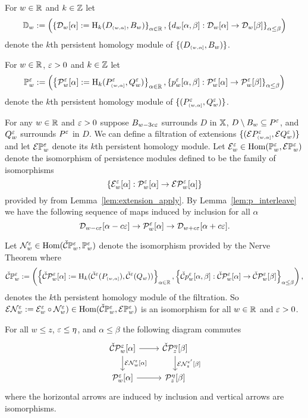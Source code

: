 
For $w\in\mathbb{R}$ and $k\in\mathbb{Z}$ let
\[ \mathbb{D}_{w} := \left(\left\{\mathcal{D}_{w}[\alpha] := \mathrm{H}_k(D_{\scriptscriptstyle (w,\alpha]},B_w)\right\}_{\alpha\in\mathbb{R}},\left\{d_w[\alpha,\beta] : \mathcal{D}_{w}[\alpha]\to\mathcal{D}_{w}[\beta]\right\}_{\alpha\leq\beta}\right)\]
denote the $k$th persistent homology module of $\{(D_{\scriptscriptstyle (w,\alpha]},B_w)\}$.

For $w\in\mathbb{R}$, $\varepsilon > 0$ and $k\in\mathbb{Z}$ let
\[\mathbb{P}_{w}^{\varepsilon} := \left(\left\{\mathcal{P}_{w}^{\varepsilon}[\alpha] := \mathrm{H}_k(P_{\scriptscriptstyle (w,\alpha]}^\varepsilon,Q_w^\varepsilon)\right\}_{\alpha\in\mathbb{R}}, \left\{p_w^\varepsilon[\alpha,\beta] : \mathcal{P}_{w}^{\varepsilon}[\alpha]\to\mathcal{P}_{w}^{\varepsilon}[\beta]\right\}_{\alpha\leq\beta}\right)\]
denote the $k$th persistent homology module of $\{(P_{\scriptscriptstyle (w,\alpha]}^\varepsilon,Q_w^\varepsilon)\}$.

For any $w\in\mathbb{R}$ and $\varepsilon > 0$ suppose $B_{w-3c\varepsilon}$ surrounds $D$ in $\mathbb{X}$, $D\setminus B_w \subseteq P^\varepsilon$, and $Q_w^\varepsilon$ surrounds $P^\varepsilon$ in $D$.
We can define a filtration of extensions $\{(\mathcal{E} P_{\scriptscriptstyle (w,\alpha]}^\varepsilon,\mathcal{E} Q_w^\varepsilon)\}$ and let $\mathcal{E} \mathbb{P}_{w}^{\varepsilon}$ denote its $k$th persistent homology module.
Let
$\mathcal{E}_w^\varepsilon \in \mathrm{Hom}(\mathbb{P}_{w}^{\varepsilon},\mathcal{E} \mathbb{P}_{w}^{\varepsilon})$
denote the isomorphism of persistence modules defined to be the family of isomorphisms
\[ \{\mathcal{E}_w^\varepsilon[\alpha] : \mathcal{P}_{w}^{\varepsilon}[\alpha]\to \mathcal{E} \mathcal{P}_{w}^{\varepsilon}[\alpha]\}\]
provided by from Lemma~\ref{lem:extension_apply}.
By Lemma~\ref{lem:p_interleave} we have the following sequence of maps induced by inclusion for all $\alpha$
\[ \mathcal{D}_{w-c\varepsilon}[\alpha-c\varepsilon]\to \mathcal{P}_{w}^{\varepsilon}[\alpha]\to \mathcal{D}_{w+c\varepsilon}[\alpha+c\varepsilon].\]

Let $\mathcal{N}_w^\varepsilon\in\mathrm{Hom}(\check{\mathcal{C}}\mathbb{P}_{w}^{\varepsilon}, \mathbb{P}_{w}^{\varepsilon})$
denote the isomorphism provided by the Nerve Theorem where
\[\check{\mathcal{C}}\mathbb{P}_{w}^{\varepsilon} := \left(\left\{\check{\mathcal{C}}\mathcal{P}_{w}^{\varepsilon}[\alpha] := \mathrm{H}_k(\check{\mathcal{C}}^\varepsilon(P_{\scriptscriptstyle (w,\alpha]}),\check{\mathcal{C}}^\varepsilon(Q_w))\right\}_{\alpha\in\mathbb{R}}, \left\{\check{\mathcal{C}} p_w^\varepsilon[\alpha,\beta] : \check{\mathcal{C}}\mathcal{P}_{w}^{\varepsilon}[\alpha]\to\check{\mathcal{C}}\mathcal{P}_{w}^{\varepsilon}[\beta]\right\}_{\alpha\leq\beta}\right),\]
denotes the $k$th persistent homology module of the \Cech filtration.
So $\mathcal{E}\mathcal{N}_w^\varepsilon := \mathcal{E}_w^\varepsilon\circ \mathcal{N}_w^\varepsilon)\in\mathrm{Hom}(\check{\mathcal{C}}\mathbb{P}_{w}^{\varepsilon}, \mathcal{E} \mathbb{P}_{w}^{\varepsilon})$ is an isomorphism for all $w\in\mathbb{R}$ and $\varepsilon > 0$.

\begin{lemma}\label{lem:excisive_nerve}
  For all $w\leq z$, $\varepsilon\leq\eta$, and $\alpha\leq\beta$ the following diagram commutes
  \begin{equation}\begin{tikzcd}
    \CP{w}{\e}{\alpha}\arrow{r}\arrow{d}{\E\N_w^\e[\alpha]} &
    \CP{z}{\eta}{\beta}\arrow{d}{\E\N_{z}^{e'}[\beta]}\\
    \P{w}{\e}{\alpha}\arrow{r} &
    \P{z}{\eta}{\beta}
  \end{tikzcd}\end{equation}
  where the horizontal arrows are induced by inclusion and vertical arrows are isomorphisms.
\end{lemma}


